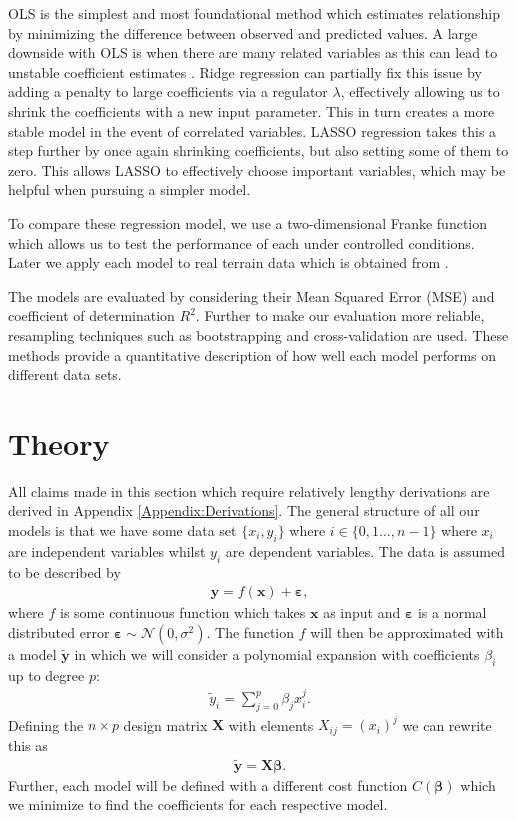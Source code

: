 \documentclass[%
reprint,
amsmath,amssymb,
aps,
pra,
]{revtex4-2}
\begin{document}
OLS is the simplest and most foundational method which estimates relationship by minimizing the difference between observed and predicted values. A large downside with OLS is when there are many related variables as this can lead to unstable coefficient estimates \cite{Bishop2006}. Ridge regression can partially fix this issue by adding a penalty to large coefficients via a regulator $\lambda$, effectively allowing us to shrink the coefficients with a new input parameter. This in turn creates a more stable model in the event of correlated variables. LASSO regression takes this a step further by once again shrinking coefficients, but also setting some of them to zero. This allows LASSO to effectively choose important variables, which may be helpful when pursuing a simpler model.

To compare these regression model, we use a two-dimensional Franke function which allows us to test the performance of each under controlled conditions. Later we apply each model to real terrain data which is obtained from \cite{USGS_EarthExplorer}.

The models are evaluated by considering their Mean Squared Error (MSE) and coefficient of determination $R^2$. Further to make our evaluation more reliable, resampling techniques such as bootstrapping and cross-validation are used. These methods provide a quantitative description of how well each model performs on different data sets.
\section{Theory}
All claims made in this section which require relatively lengthy derivations are derived in Appendix \ref{Appendix:Derivations}. The general structure of all our models is that we have some data set $\{x_i,y_i\}$ where $i\in\{0,1...,n-1\}$ where $x_i$ are independent variables whilst $y_i$ are dependent variables. The data is assumed to be described by
\begin{align}
	\bm y=f(\bm x)+\bm \varepsilon,
	\label{eq:data}
\end{align}
where $f$ is some continuous function which takes $\bm x$ as input and $\bm\varepsilon$ is a normal distributed error $\bm\varepsilon\sim\mathcal{N}(0,\sigma^2)$. The function $f$ will then be approximated with a model $\tilde{\bm y}$ in which we will consider a polynomial expansion with coefficients $\beta_i$ up to degree $p$:
\begin{align}
	\tilde{y}_i=\sum_{j=0}^{p}\beta_j x_i^j.
	\label{eq:model}
\end{align}
Defining the $n\times p$ design matrix $\bm X$ with elements $X_{ij}=(x_i)^j$ we can rewrite this as
\begin{align}
	\tilde{\bm y}=\bm X\bm\beta.
\end{align}
Further, each model will be defined with a different cost function $C(\bm\beta)$ which we minimize to find the coefficients for each respective model.
\end{document}
